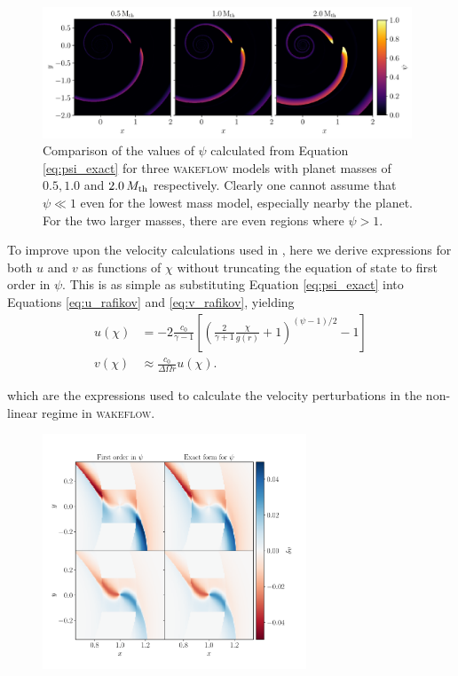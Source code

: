\begin{figure}
    \centering
    \includegraphics[width = 0.98\textwidth]{figures/psi 2.pdf}
    \caption{Comparison of the values of $\psi$ calculated from Equation \ref{eq:psi_exact} for three \textsc{wakeflow} models with planet masses of $0.5, 1.0$ and $2.0 \, M_{\rm{th}}$ respectively. Clearly one cannot assume that $\psi \ll 1$ even for the lowest mass model, especially nearby the planet. For the two larger masses, there are even regions where $\psi > 1$.}
    \label{fig:psi_comparison}
\end{figure}

To improve upon the velocity calculations used in \citet{bollati2021}, here we derive expressions for both $u$ and $v$ as functions of $\chi$ without truncating the equation of state to first order in $\psi$. This is as simple as substituting Equation \ref{eq:psi_exact} into Equations \ref{eq:u_rafikov} and \ref{eq:v_rafikov}, yielding
\begin{align}
    u(\chi) &= -2 \frac{c_0}{\gamma - 1} \left[ \left( \frac{2}{\gamma + 1} \frac{\chi}{g(r)} +1  \right)^{(\psi-1)/2} -1 \right] \\
    v(\chi) &\approx \frac{c_0}{\Delta\Omega r} u (\chi).
\end{align}




which are the expressions used to calculate the velocity perturbations in the non-linear regime in \textsc{wakeflow}. 

\begin{figure}
    \centering
    \includegraphics[width = 0.7\textwidth]{figures/0_5_mth.pdf}
    \caption{}
    \label{fig:0_5mth}
\end{figure}


